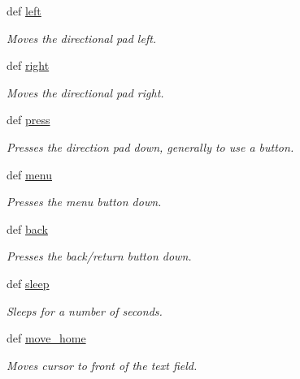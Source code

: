 \begin{DoxyCompactItemize}
def \hyperlink{namespacemaml_aba73c0fea404e32ad8277bce4628f8ae}{left}
\begin{DoxyCompactList}\small\item\em Moves the directional pad left. \item\end{DoxyCompactList}\item 
def \hyperlink{namespacemaml_a54a55c07aa08890909390ad8509a3ce8}{right}
\begin{DoxyCompactList}\small\item\em Moves the directional pad right. \item\end{DoxyCompactList}\item 
def \hyperlink{namespacemaml_af6c432729f675613f4ca14a10915ccf7}{press}
\begin{DoxyCompactList}\small\item\em Presses the direction pad down, generally to use a button. \item\end{DoxyCompactList}\item 
def \hyperlink{namespacemaml_ae2bf71798e83545c519bab4d3b795ce2}{menu}
\begin{DoxyCompactList}\small\item\em Presses the menu button down. \item\end{DoxyCompactList}\item 
def \hyperlink{namespacemaml_a11b3de3ba008d3d7e97117fedbe51f8f}{back}
\begin{DoxyCompactList}\small\item\em Presses the back/return button down. \item\end{DoxyCompactList}\item 
def \hyperlink{namespacemaml_a420f987d7746ab4c63f2f35ce8ba2127}{sleep}
\begin{DoxyCompactList}\small\item\em Sleeps for a number of seconds. \item\end{DoxyCompactList}\item 
def \hyperlink{namespacemaml_a54233da7eb3ce17e74d4377c0631bc84}{move\_\-home}
\begin{DoxyCompactList}\small\item\em Moves cursor to front of the text field. \item\end{DoxyCompactList}\item 

\end{DoxyCompactItemize}
